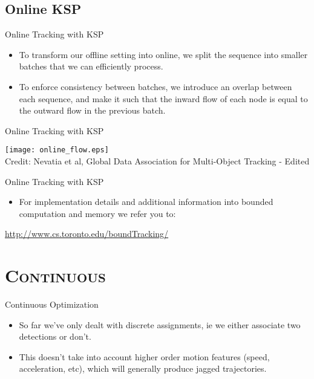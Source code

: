 \subsection{Online KSP}
\begin{frame}{Online Tracking with KSP}
	\begin{itemize}
		\item To transform our offline setting into online, we split the sequence into smaller batches that we can efficiently process.
		\item To enforce consistency between batches, we introduce an overlap between each sequence, and make it such that the inward flow of each node is equal to the outward flow in the previous batch.
	\end{itemize}
\end{frame}

\begin{frame}{Online Tracking with KSP}
\begin{center}
	\texttt{[image: online\_flow.eps]}\\
	{\tiny Credit: Nevatia et al, Global Data Association for Multi-Object Tracking - Edited}
\end{center}
\end{frame}


\begin{frame}{Online Tracking with KSP}
	\begin{itemize}
		\item For implementation details and additional information into bounded computation and memory we refer you to:
	\end{itemize}
	\begin{center}
		\url{http://www.cs.toronto.edu/boundTracking/}
	\end{center}
\end{frame}


\section{\scshape Continuous}
\begin{frame}{Continuous Optimization}
	\begin{itemize}
		\item So far we've only dealt with discrete assignments, ie we either associate two detections or don't.
		\item This doesn't take into account higher order motion features (speed, acceleration, etc), which will generally produce jagged trajectories.
	\end{itemize}
\end{frame}


